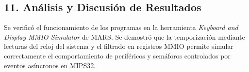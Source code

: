 \documentclass[12pt,a4paper]{article}
\begin{document}
\subsection*{11. Análisis y Discusión de Resultados}
Se verificó el funcionamiento de los programas en la herramienta \textit{Keyboard and Display MMIO Simulator} de MARS. Se demostró que la temporización mediante lecturas del reloj del sistema y el filtrado en registros MMIO permite simular correctamente el comportamiento de periféricos y semáforos controlados por eventos asíncronos en MIPS32.
\end{document}
